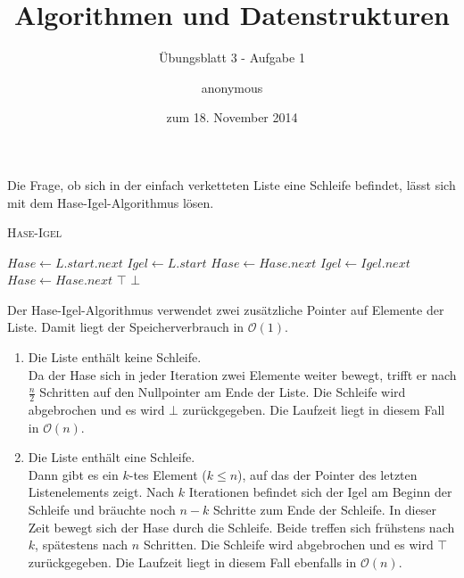 \documentclass[a4paper]{scrartcl}
\title{Algorithmen und Datenstrukturen}
\subtitle{Übungsblatt 3 - Aufgabe 1}
\author{
    anonymous
}
\date{zum 18. November 2014}
\begin{document}
\maketitle

Die Frage, ob sich in der einfach verketteten Liste eine Schleife befindet,
lässt sich mit dem Hase-Igel-Algorithmus lösen.

\begin{algorithm}
    \caption{\textsc{Hase-Igel}}
    \begin{algorithmic}[1]
        \State $Hase \gets L.start.next$
        \State $Igel \gets L.start$
            \State $Hase \gets Hase.next$
            \State $Igel \gets Igel.next$
                \State $Hase \gets Hase.next$
            \EndIf
        \EndWhile
            \State \Return $\top$
        \Else
            \State \Return $\bot$
        \EndIf
        \EndProcedure
    \end{algorithmic}
\end{algorithm}

Der Hase-Igel-Algorithmus verwendet zwei zusätzliche Pointer auf Elemente der
Liste.
Damit liegt der Speicherverbrauch in $\mathcal{O}(1)$.

\begin{enumerate}
    \item Die Liste enthält keine Schleife. \\
        Da der Hase sich in jeder Iteration zwei Elemente weiter bewegt, trifft
        er nach $\frac{n}{2}$ Schritten auf den Nullpointer am Ende der Liste.
        Die Schleife wird abgebrochen und es wird $\bot$ zurückgegeben.
        Die Laufzeit liegt in diesem Fall in $\mathcal{O}(n)$.

    \item Die Liste enthält eine Schleife. \\
        Dann gibt es ein $k$-tes Element ($k \leq n$), auf das der Pointer des letzten
        Listenelements zeigt.
        Nach $k$ Iterationen befindet sich der Igel am Beginn der Schleife und
        bräuchte noch $n-k$ Schritte zum Ende der Schleife.
        In dieser Zeit bewegt sich der Hase durch die Schleife.
        Beide treffen sich frühstens nach $k$, spätestens nach $n$ Schritten.
        Die Schleife wird abgebrochen und es wird $\top$ zurückgegeben.
        Die Laufzeit liegt in diesem Fall ebenfalls in $\mathcal{O}(n)$.

\end{enumerate}
\end{document}
